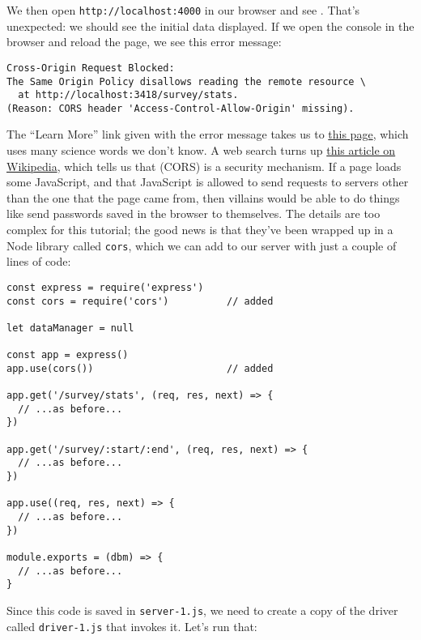 
We then open \texttt{http://localhost:4000} in our browser and see .
That's unexpected: we should see the initial data displayed.
If we open the console in the browser and reload the page,
we see this error message:

\begin{verbatim}
Cross-Origin Request Blocked:
The Same Origin Policy disallows reading the remote resource \
  at http://localhost:3418/survey/stats.
(Reason: CORS header 'Access-Control-Allow-Origin' missing).
\end{verbatim}

\noindent
The ``Learn More'' link given with the error message takes us to
\href{https://developer.mozilla.org/en-US/docs/Web/HTTP/CORS/Errors/CORSMissingAllowOrigin}{this page},
which uses many science words we don't know.
A web search turns up \href{https://en.wikipedia.org/wiki/Cross-origin_resource_sharing}{this article on Wikipedia},
which tells us that \gref{g:cors}{Cross-origin resource sharing} (CORS)
is a security mechanism.
If a page loads some JavaScript,
and that JavaScript is allowed to send requests to servers other than the one that the page came from,
then villains would be able to do things like send passwords saved in the browser to themselves.
The details are too complex for this tutorial;
the good news is that they've been wrapped up in a Node library called \texttt{cors},
which we can add to our server with just a couple of lines of code:

\begin{verbatim}
const express = require('express')
const cors = require('cors')          // added

let dataManager = null

const app = express()
app.use(cors())                       // added

app.get('/survey/stats', (req, res, next) => {
  // ...as before...
})

app.get('/survey/:start/:end', (req, res, next) => {
  // ...as before...
})

app.use((req, res, next) => {
  // ...as before...
})

module.exports = (dbm) => {
  // ...as before...
}
\end{verbatim}

Since this code is saved in \texttt{server-1.js},
we need to create a copy of the driver called \texttt{driver-1.js} that invokes it.
Let's run that:

